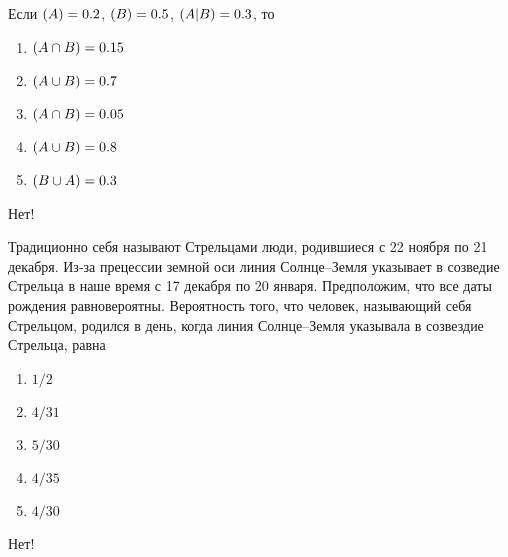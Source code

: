 \documentclass[t]{beamer}
\let\P\relax
\DeclareMathOperator{\P}{\mathbb{P}}
\begin{document}
 \begin{frame} \label{5-No} 
\begin{block}{5} 

  Если $\P(A)=0.2$, $\P(B)=0.5$, $\P(A | B) = 0.3$, то
  


 \end{block} 
\begin{enumerate} 
\item[] \hyperlink{5-Yes}{\beamergotobutton{} $\P(A \cap B) = 0.15$}
\item[] \hyperlink{5-No}{\beamergotobutton{} $\P(A \cup B) = 0.7$}
\item[] \hyperlink{5-No}{\beamergotobutton{} $\P(A \cap B) = 0.05$}
\item[] \hyperlink{5-No}{\beamergotobutton{} $\P(A \cup B) = 0.8$}
\item[] \hyperlink{5-No}{\beamergotobutton{} $\P(B \cup A) = 0.3$}
\end{enumerate} 

 \alert{Нет!} 
\end{frame} 


 \begin{frame} \label{6-No} 
\begin{block}{6} 

  Традиционно себя называют Стрельцами люди, родившиеся с 22 ноября по 21 декабря. Из-за прецессии земной оси линия Солнце–Земля указывает в созведие Стрельца в наше время с 17 декабря по 20 января. Предположим, что все даты рождения равновероятны. Вероятность того, что человек, называющий себя Стрельцом, родился в день, когда линия Солнце–Земля указывала в созвездие Стрельца, равна
  


 \end{block} 
\begin{enumerate} 
\item[] \hyperlink{6-No}{\beamergotobutton{} $1/2$}
\item[] \hyperlink{6-No}{\beamergotobutton{} $4/31$}
\item[] \hyperlink{6-Yes}{\beamergotobutton{} $5/30$}
\item[] \hyperlink{6-No}{\beamergotobutton{} $4/35$}
\item[] \hyperlink{6-No}{\beamergotobutton{} $4/30$}
\end{enumerate} 

 \alert{Нет!} 
\end{frame} 
\end{document}
